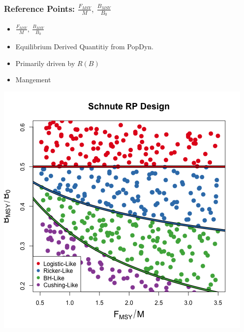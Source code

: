 \documentclass[a0paper,portrait]{baposter}
\begin{document}
\begin{poster}
{\begin{minipage}[b]{0.5\textwidth}
	\subsubsection*{Reference Points: $\frac{F_{MSY}}{M}, ~\frac{B_{MSY}}{B_0}$}
	
	
        \begin{minipage}[b]{0.5\textwidth}
	\begin{itemize}
		\item $\frac{F_{MSY}}{M}, ~\frac{B_{MSY}}{B_0}$
		\item Equilibrium Derived Quantitiy from PopDyn.
		\item Primarily driven by $R(B)$
                \item Mangement
        \end{itemize}
	\end{minipage}
        \begin{minipage}[b]{0.48\textwidth}
	\includegraphics[width=\textwidth]{../../ddBias/designLineColorHHardFlatT30N150WWideN112.png}
	\end{minipage}
	

\end{minipage}}
\end{poster}
\end{document}
